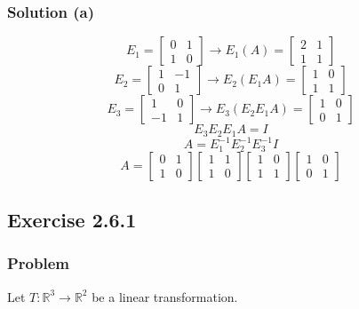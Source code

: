 \documentclass[12pt]{article}
\begin{document}
\subsubsection*{Solution (a)}
\[
  E_1 = \begin{bmatrix}
    0 & 1\\ 
    1 & 0 
  \end{bmatrix}\longrightarrow E_1(A) = \begin{bmatrix}
    2 & 1\\ 
    1 & 1 
  \end{bmatrix}
\]
\[
  E_2 = \begin{bmatrix}
    1 & -1\\ 
    0 & 1 
  \end{bmatrix}\longrightarrow E_2(E_1A) = \begin{bmatrix}
    1 & 0\\ 
    1 & 1 
  \end{bmatrix}
\]
\[
  E_3 = \begin{bmatrix}
    1 & 0\\ 
    -1 & 1 
  \end{bmatrix}\longrightarrow E_3(E_2E_1A) = \begin{bmatrix}
    1 & 0\\ 
    0 & 1 
  \end{bmatrix}
\]
\[
  E_3E_2E_1A = I 
\]
\[
  A = E^{-1}_1E^{-1}_2E^{-1}_3I
\]
\[
  A = \begin{bmatrix}
    0 & 1\\ 
    1 & 0 
  \end{bmatrix}\begin{bmatrix}
    1 & 1\\ 
    1 & 0 
  \end{bmatrix}\begin{bmatrix}
    1 & 0\\ 
    1 & 1 
  \end{bmatrix}\begin{bmatrix}
    1 & 0\\ 
    0 & 1 
  \end{bmatrix}
\]
\vspace{2in}
\subsection*{Exercise 2.6.1}
\subsubsection*{Problem}
Let $T: \mathbb{R}^3 \rightarrow \mathbb{R}^2$ be a linear transformation.
\end{document}
